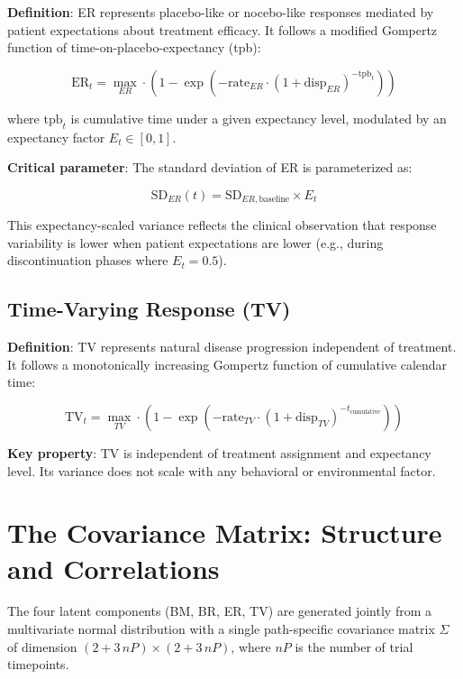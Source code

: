\documentclass[12pt,a4paper]{article}
\begin{document}
\textbf{Definition}: ER represents placebo-like or nocebo-like responses mediated by patient expectations about treatment efficacy. It follows a modified Gompertz function of time-on-placebo-expectancy (tpb):

\begin{equation}
\text{ER}_t = \max_{ER} \cdot \left(1 - \exp\left(-\text{rate}_{ER} \cdot \left(1 + \text{disp}_{ER}\right)^{-\text{tpb}_t}\right)\right)
\end{equation}

where $\text{tpb}_t$ is cumulative time under a given expectancy level, modulated by an expectancy factor $E_t \in [0, 1]$.

\textbf{Critical parameter}: The standard deviation of ER is parameterized as:

\begin{equation}
\text{SD}_{ER}(t) = \text{SD}_{ER, \text{baseline}} \times E_t
\end{equation}

This expectancy-scaled variance reflects the clinical observation that response variability is lower when patient expectations are lower (e.g., during discontinuation phases where $E_t = 0.5$).

\subsection{Time-Varying Response (TV)}

\textbf{Definition}: TV represents natural disease progression independent of treatment. It follows a monotonically increasing Gompertz function of cumulative calendar time:

\begin{equation}
\text{TV}_t = \max_{TV} \cdot \left(1 - \exp\left(-\text{rate}_{TV} \cdot \left(1 + \text{disp}_{TV}\right)^{-t_{\text{cumulative}}}\right)\right)
\end{equation}

\textbf{Key property}: TV is independent of treatment assignment and expectancy level. Its variance does not scale with any behavioral or environmental factor.

\section{The Covariance Matrix: Structure and Correlations}

The four latent components (BM, BR, ER, TV) are generated jointly from a multivariate normal distribution with a single path-specific covariance matrix $\Sigma$ of dimension $(2 + 3\,nP) \times (2 + 3\,nP)$, where $nP$ is the number of trial timepoints.
\end{document}
